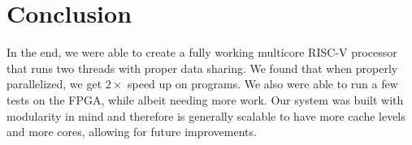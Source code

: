 \documentclass{article}
\begin{document}
\section{Conclusion}

In the end, we were able to create a fully working multicore RISC-V processor that runs two threads with proper data sharing. We found that when properly parallelized, we get $2\times$ speed up on programs. We also were able to run a few tests on the FPGA, while albeit needing more work. Our system was built with modularity in mind and therefore is generally scalable to have more cache levels and more cores, allowing for future improvements.

\end{document}
